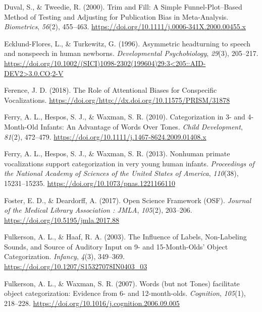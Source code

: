 \documentclass[man,floatsintext]{apa6}
\begin{document}
\leavevmode\hypertarget{ref-duval_trim_2000}{}%
Duval, S., \& Tweedie, R. (2000). Trim and Fill: A Simple Funnel-Plot--Based Method of Testing and Adjusting for Publication Bias in Meta-Analysis. \emph{Biometrics}, \emph{56}(2), 455--463. \url{https://doi.org/10.1111/j.0006-341X.2000.00455.x}

\leavevmode\hypertarget{ref-ecklund-flores_asymmetric_1996}{}%
Ecklund-Flores, L., \& Turkewitz, G. (1996). Asymmetric headturning to speech and nonspeech in human newborns. \emph{Developmental Psychobiology}, \emph{29}(3), 205--217. \href{https://doi.org/10.1002/(SICI)1098-2302(199604)29:3\%3C205::AID-DEV2\%3E3.0.CO;2-V}{https://doi.org/10.1002/(SICI)1098-2302(199604)29:3\textless{}205::AID-DEV2\textgreater{}3.0.CO;2-V}

\leavevmode\hypertarget{ref-ference_role_2018}{}%
Ference, J. D. (2018). The Role of Attentional Biases for Conspecific Vocalizations. \url{https://doi.org/http://dx.doi.org/10.11575/PRISM/31878}

\leavevmode\hypertarget{ref-ferry_categorization_2010}{}%
Ferry, A. L., Hespos, S. J., \& Waxman, S. R. (2010). Categorization in 3- and 4-Month-Old Infants: An Advantage of Words Over Tones. \emph{Child Development}, \emph{81}(2), 472--479. \url{https://doi.org/10.1111/j.1467-8624.2009.01408.x}

\leavevmode\hypertarget{ref-ferry_nonhuman_2013}{}%
Ferry, A. L., Hespos, S. J., \& Waxman, S. R. (2013). Nonhuman primate vocalizations support categorization in very young human infants. \emph{Proceedings of the National Academy of Sciences of the United States of America}, \emph{110}(38), 15231--15235. \url{https://doi.org/10.1073/pnas.1221166110}

\leavevmode\hypertarget{ref-foster_open_2017}{}%
Foster, E. D., \& Deardorff, A. (2017). Open Science Framework (OSF). \emph{Journal of the Medical Library Association : JMLA}, \emph{105}(2), 203--206. \url{https://doi.org/10.5195/jmla.2017.88}

\leavevmode\hypertarget{ref-fulkerson_influence_2003}{}%
Fulkerson, A. L., \& Haaf, R. A. (2003). The Influence of Labels, Non-Labeling Sounds, and Source of Auditory Input on 9- and 15-Month-Olds' Object Categorization. \emph{Infancy}, \emph{4}(3), 349--369. \url{https://doi.org/10.1207/S15327078IN0403_03}

\leavevmode\hypertarget{ref-fulkerson_words_2007}{}%
Fulkerson, A. L., \& Waxman, S. R. (2007). Words (but not Tones) facilitate object categorization: Evidence from 6- and 12-month-olds. \emph{Cognition}, \emph{105}(1), 218--228. \url{https://doi.org/10.1016/j.cognition.2006.09.005}
\end{document}
